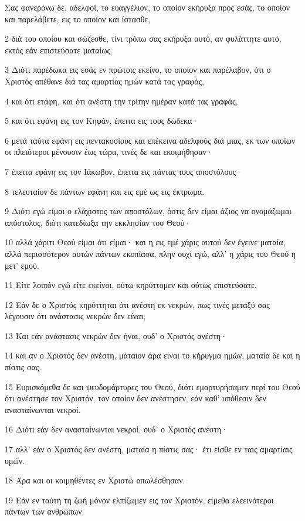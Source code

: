 \par Σας φανερόνω δε, αδελφοί, το ευαγγέλιον, το οποίον εκήρυξα προς εσάς, το οποίον και παρελάβετε, εις το οποίον και ίστασθε,
\par 2 διά του οποίου και σώζεσθε, τίνι τρόπω σας εκήρυξα αυτό, αν φυλάττητε αυτό, εκτός εάν επιστεύσατε ματαίως.
\par 3 Διότι παρέδωκα εις εσάς εν πρώτοις εκείνο, το οποίον και παρέλαβον, ότι ο Χριστός απέθανε διά τας αμαρτίας ημών κατά τας γραφάς,
\par 4 και ότι ετάφη, και ότι ανέστη την τρίτην ημέραν κατά τας γραφάς,
\par 5 και ότι εφάνη εις τον Κηφάν, έπειτα εις τους δώδεκα·
\par 6 μετά ταύτα εφάνη εις πεντακοσίους και επέκεινα αδελφούς διά μιας, εκ των οποίων οι πλειότεροι μένουσιν έως τώρα, τινές δε και εκοιμήθησαν·
\par 7 έπειτα εφάνη εις τον Ιάκωβον, έπειτα εις πάντας τους αποστόλους·
\par 8 τελευταίον δε πάντων εφάνη και εις εμέ ως εις έκτρωμα.
\par 9 Διότι εγώ είμαι ο ελάχιστος των αποστόλων, όστις δεν είμαι άξιος να ονομάζωμαι απόστολος, διότι κατεδίωξα την εκκλησίαν του Θεού·
\par 10 αλλά χάριτι Θεού είμαι ότι είμαι· και η εις εμέ χάρις αυτού δεν έγεινε ματαία, αλλά περισσότερον αυτών πάντων εκοπίασα, πλην ουχί εγώ, αλλ' η χάρις του Θεού η μετ' εμού.
\par 11 Είτε λοιπόν εγώ είτε εκείνοι, ούτω κηρύττομεν και ούτως επιστεύσατε.
\par 12 Εάν δε ο Χριστός κηρύττηται ότι ανέστη εκ νεκρών, πως τινές μεταξύ σας λέγουσιν ότι ανάστασις νεκρών δεν είναι;
\par 13 Και εάν ανάστασις νεκρών δεν ήναι, ουδ' ο Χριστός ανέστη·
\par 14 και αν ο Χριστός δεν ανέστη, μάταιον άρα είναι το κήρυγμα ημών, ματαία δε και η πίστις σας.
\par 15 Ευρισκόμεθα δε και ψευδομάρτυρες του Θεού, διότι εμαρτυρήσαμεν περί του Θεού ότι ανέστησε τον Χριστόν, τον οποίον δεν ανέστησεν, εάν καθ' υπόθεσιν δεν ανασταίνωνται νεκροί.
\par 16 Διότι εάν δεν ανασταίνωνται νεκροί, ουδ' ο Χριστός ανέστη·
\par 17 αλλ' εάν ο Χριστός δεν ανέστη, ματαία η πίστις σας· έτι είσθε εν ταις αμαρτίαις υμών.
\par 18 Άρα και οι κοιμηθέντες εν Χριστώ απωλέσθησαν.
\par 19 Εάν εν ταύτη τη ζωή μόνον ελπίζωμεν εις τον Χριστόν, είμεθα ελεεινότεροι πάντων των ανθρώπων.
